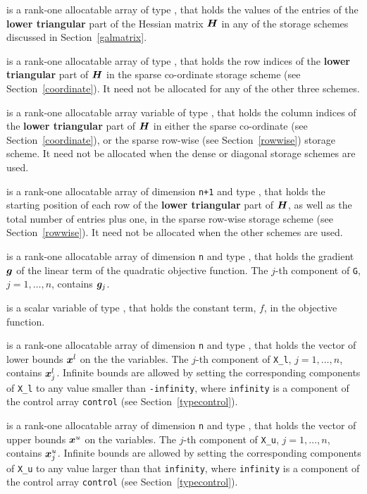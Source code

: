 \documentclass{galahad}
\begin{document}
\begin{description}
\begin{description}
 is a rank-one allocatable array of type \realdp, that holds
the values of the entries of the {\bf lower triangular} part
of the Hessian matrix ${\bm{H}}$ in any of the 
storage schemes discussed in Section~\ref{galmatrix}.

 is a rank-one allocatable array of type \integer,
that holds the row indices of the {\bf lower triangular} part of ${\bm{H}}$ 
in the sparse co-ordinate storage
scheme (see Section~\ref{coordinate}). 
It need not be allocated for any of the other three schemes.

 is a rank-one allocatable array variable of type \integer,
that holds the column indices of the {\bf lower triangular} part of 
${\bm{H}}$ in either the sparse co-ordinate 
(see Section~\ref{coordinate}), or the sparse row-wise 
(see Section~\ref{rowwise}) storage scheme.
It need not be allocated when the dense or diagonal storage schemes are used.

 is a rank-one allocatable array of dimension {\tt n+1} and type 
\integer, that holds the starting position of 
each row of the {\bf lower triangular} part of ${\bm{H}}$, as well
as the total number of entries plus one, in the sparse row-wise storage
scheme (see Section~\ref{rowwise}). It need not be allocated when the
other schemes are used.

\end{description}

 is a rank-one allocatable array of dimension {\tt n} and type 
\realdp, that holds the gradient ${\bm{g}}$ 
of the linear term of the quadratic objective function.
The $j$-th component of 
{\tt G}, $j = 1,  \ldots ,  n$, contains ${\bm{g}}_{j}$.

 is a scalar variable of type 
\realdp, that holds 
the constant term, $f$, in the objective function.

 is a rank-one allocatable array of dimension {\tt n} and type 
\realdp, that holds
the vector of lower bounds ${\bm{x}}^{l}$ on the the variables.
The $j$-th component of {\tt X\_l}, $j = 1, \ldots , n$, 
contains ${\bm{x}}_{j}^{l}$.
Infinite bounds are allowed by setting the corresponding 
components of {\tt X\_l} to any value smaller than {\tt -infinity}, 
where {\tt infinity} is a component of the control array {\tt control} 
(see Section~\ref{typecontrol}).

 is a rank-one allocatable array of dimension {\tt n} and type 
\realdp, that holds
the vector of upper bounds ${\bm{x}}^{u}$ on the variables.
The $j$-th component of {\tt X\_u}, $j = 1, \ldots , n$, 
contains ${\bm{x}}_{j}^{u}$.
Infinite bounds are allowed by setting the corresponding 
components of {\tt X\_u} to any value larger than that {\tt infinity}, 
where {\tt infinity} is a component of the control array {\tt control} 
(see Section~\ref{typecontrol}).


\end{description}
\end{document}
